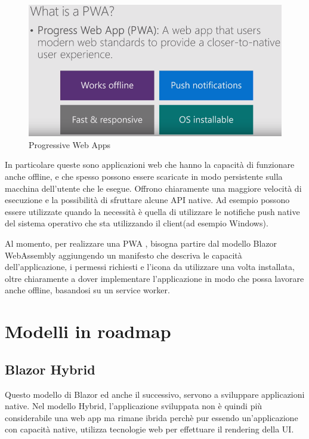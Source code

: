\begin{figure}[H]
	\centerline{\includegraphics[scale=0.5]{figure/ProgressiveWebApp.png}}
	\caption{Progressive Web Apps}
	\label{fig:WhatIsAPWA}
\end{figure}

In particolare queste sono applicazioni web che hanno la capacit\`a di funzionare anche offline, e che spesso possono essere scaricate in modo persistente sulla macchina dell'utente che le esegue.
Offrono chiaramente una maggiore velocit\`a di esecuzione e la possibilit\`a di sfruttare alcune API native.
Ad esempio possono essere utilizzate quando la necessit\`a \`e quella di utilizzare le notifiche push native del sistema operativo che sta utilizzando il client(ad esempio Windows).

Al momento, per realizzare una PWA , bisogna partire dal modello Blazor WebAssembly aggiungendo un manifesto che descriva le capacit\`a dell'applicazione, i permessi richiesti e l'icona da utilizzare una volta installata, oltre chiaramente a dover implementare l'applicazione in modo che possa lavorare anche offline, basandosi su un service worker.\cite{blazorPWA}
\pagebreak

\section{Modelli in roadmap}
\subsection{Blazor Hybrid}\label{sez:bhybrid}
Questo modello di Blazor ed anche il successivo, servono a sviluppare applicazioni native.
Nel modello Hybrid, l'applicazione sviluppata non \`e quindi pi\`u considerabile una web app ma rimane ibrida perch\`e pur essendo un'applicazione con capacit\`a native, utilizza tecnologie web per effettuare il rendering della UI.

